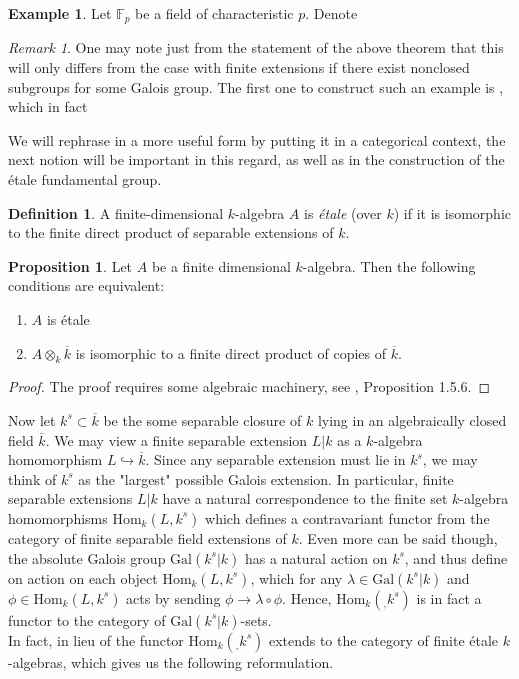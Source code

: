 \documentclass{article}
\theoremstyle{definition}
\newtheorem{proposition}[theorem]{Proposition}
\newtheorem{definition}[theorem]{Definition}
\newtheorem{example}[theorem]{Example}
\theoremstyle{remark}
\newtheorem*{remark}{Remark}
\begin{document}
\begin{example}
	Let $\mathbb{F}_p$ be a field of characteristic $p$.
	Denote 

\end{example}


\begin{remark}
	One may note just from the statement of the above theorem that this will only differs from the case with finite extensions if there exist nonclosed subgroups for some Galois group.
	The first one to construct such an example is , which in fact 
\end{remark}

We will rephrase  in a more useful form by putting it in a categorical context, the next notion will be important in this regard, as well as in the construction of the \'etale fundamental group.

\begin{definition} 
	A finite-dimensional $k$-algebra $A$ is \textit{\'etale} (over $k$) if it is isomorphic to the finite direct product of separable extensions of $k$.
\end{definition}

\begin{proposition} 
	Let $A$ be a finite dimensional $k$-algebra.
	Then the following conditions are equivalent:
	\begin{enumerate}
		\item $A$ is \'etale
		\item $A \otimes_k \overline{k}$ is isomorphic to a finite direct product of copies of $\overline{k}$.
	\end{enumerate}
\end{proposition}
\begin{proof}
	The proof requires some algebraic machinery, see \cite{Szamuely}, Proposition 1.5.6.
\end{proof}

Now let $k^s \subset \overline{k}$ be the some separable closure of $k$ lying in an algebraically closed field $\overline{k}$.
We may view a finite separable extension $L|k$ as a $k$-algebra homomorphism $L \hookrightarrow \overline{k}$. Since any separable extension must lie in $k^s$, we may think of $k^s$ as the "largest" possible Galois extension.
In particular, finite separable extensions $L|k$ have a natural correspondence to the finite set $k$-algebra homomorphisms $\text{Hom}_k(L, k^s)$
 which defines a contravariant functor from the category of finite separable field extensions of $k$.
 Even more can be said though, the absolute Galois group $\text{Gal}(k^s|k)$ has a natural action on $k^s$, and thus define on action on each object $\text{Hom}_k(L, k^s)$, which for any $\lambda \in \text{Gal}(k^s|k)$ and $\phi \in \text{Hom}_k(L, k^s)$ acts by sending $\phi \to \lambda \circ \phi$.
 Hence, $\text{Hom}_k(_, k^s)$ is in fact a functor to the category of $\text{Gal}(k^s|k)$-sets.\\
\indent In fact, in lieu of  the functor $\text{Hom}_k(_,k^s)$ extends to the category of finite \'etale $k$-algebras, which gives us the following reformulation.
\end{document}
